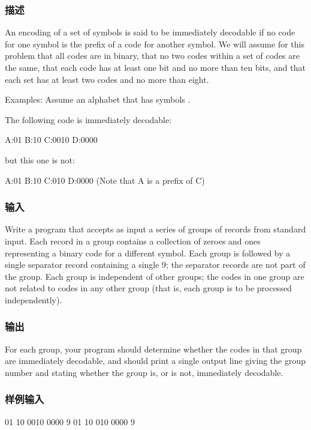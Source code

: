 \subsubsection{描述}
An encoding of a set of symbols is said to be immediately decodable if no code for one symbol is the prefix of a code for another symbol. We will assume for this problem that all codes are in binary, that no two codes within a set of codes are the same, that each code has at least one bit and no more than ten bits, and that each set has at least two codes and no more than eight. 

Examples: Assume an alphabet that has symbols .

The following code is immediately decodable: 
\begin{Code}
A:01 B:10 C:0010 D:0000 
\end{Code}

but this one is not: 
\begin{Code}
A:01 B:10 C:010 D:0000 (Note that A is a prefix of C) 
\end{Code}


\subsubsection{输入}
Write a program that accepts as input a series of groups of records from standard input. Each record in a group contains a collection of zeroes and ones representing a binary code for a different symbol. Each group is followed by a single separator record containing a single 9; the separator records are not part of the group. Each group is independent of other groups; the codes in one group are not related to codes in any other group (that is, each group is to be processed independently).


\subsubsection{输出}
For each group, your program should determine whether the codes in that group are immediately decodable, and should print a single output line giving the group number and stating whether the group is, or is not, immediately decodable.

\subsubsection{样例输入}
\begin{Code}
01
10
0010
0000
9
01
10
010
0000
9
\end{Code}

